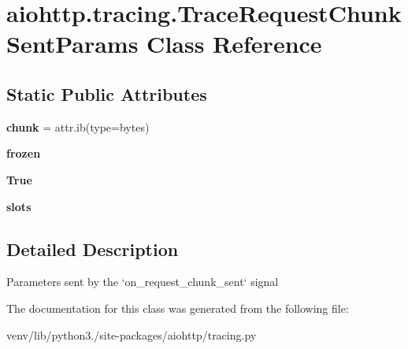 \hypertarget{classaiohttp_1_1tracing_1_1_trace_request_chunk_sent_params}{}\section{aiohttp.\+tracing.\+Trace\+Request\+Chunk\+Sent\+Params Class Reference}
\label{classaiohttp_1_1tracing_1_1_trace_request_chunk_sent_params}
\subsection*{Static Public Attributes}
\begin{DoxyCompactItemize}
\item 
\mbox{\label{classaiohttp_1_1tracing_1_1_trace_request_chunk_sent_params_a0f6b9edea7e983d7ee9f6655b7bc915f}} 
{\bfseries chunk} = attr.\+ib(type=bytes)
\item 
\mbox{\label{classaiohttp_1_1tracing_1_1_trace_request_chunk_sent_params_ae1dc7a1cfafb69aff53839dc527ede15}} 
{\bfseries frozen}
\item 
\mbox{\label{classaiohttp_1_1tracing_1_1_trace_request_chunk_sent_params_aa977fa1e0f66891ce4ebe7ade9a9ac9f}} 
{\bfseries True}
\item 
\mbox{\label{classaiohttp_1_1tracing_1_1_trace_request_chunk_sent_params_a9bc3d9ced7afa93260ef101dd3b45aff}} 
{\bfseries slots}
\end{DoxyCompactItemize}


\subsection{Detailed Description}
\begin{DoxyVerb}Parameters sent by the `on_request_chunk_sent` signal\end{DoxyVerb}
 

The documentation for this class was generated from the following file\+:\begin{DoxyCompactItemize}
\item 
venv/lib/python3./site-\/packages/aiohttp/tracing.\+py\end{DoxyCompactItemize}
